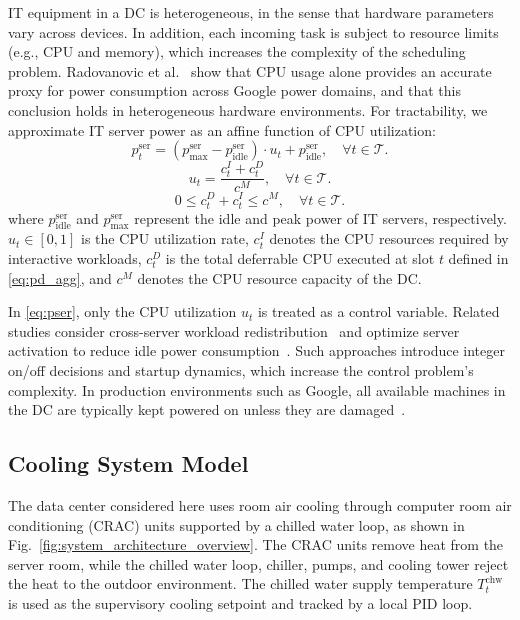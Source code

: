 \documentclass[a4paper,fleqn]{cas-dc}
\theoremstyle{plain}
\theoremstyle{remark}
\theoremstyle{plain}
\begin{document}
IT equipment in a DC is heterogeneous, in the sense that hardware parameters vary across devices. In addition, each incoming task is subject to resource limits (e.g., CPU and memory), which increases the complexity of the scheduling problem. Radovanovic et al.~\cite{radovanovic2023_carbon_aware_computing} show that CPU usage alone provides an accurate proxy for power consumption across Google power domains, and that this conclusion holds in heterogeneous hardware environments. For tractability, we approximate IT server power as an affine function of CPU utilization:
\begin{equation} \label{eq:pser}
p_t^{\text{ser}} = (p_{\max}^{\text{ser}}-p_{\text{idle}}^{\text{ser}})\cdot u_t + p_{\text{idle}}^{\text{ser}}, \quad \forall t\in\mathcal{T}.
\end{equation}
\begin{equation}\label{eq:util}
u_t = \frac{c_t^I + c_t^D}{c^M}, \quad \forall t\in\mathcal{T}.
\end{equation}
\begin{equation}\label{eq:cap}
0 \le c_t^D + c_t^I \le c^M ,\quad \forall t\in\mathcal{T}.
\end{equation}
where $p_{\text{idle}}^{\text{ser}}$ and $p_{\max}^{\text{ser}}$ represent the idle and peak power of IT servers, respectively. $u_t \in \left[0, 1\right]$ is the CPU utilization rate, $c_t^I$ denotes the CPU resources required by interactive workloads, $c_t^D$ is the total deferrable CPU executed at slot $t$ defined in \eqref{eq:pd_agg}, and $c^M$ denotes the CPU resource capacity of the DC.

In \eqref{eq:pser}, only the CPU utilization $u_t$ is treated as a control variable. Related studies consider cross-server workload redistribution~\cite{li2023_thermal_aware_failure} and optimize server activation to reduce idle power consumption~\cite{chitsaz2024_ctmdp_power_mgmt}. Such approaches introduce integer on/off decisions and startup dynamics, which increase the control problem's complexity. In production environments such as Google, all available machines in the DC are typically kept powered on unless they are damaged~\cite{radovanovic2023_carbon_aware_computing}.

\subsection{Cooling System Model}
The data center considered here uses room air cooling through computer room air conditioning (CRAC) units supported by a chilled water loop, as shown in Fig.~\ref{fig:system_architecture_overview}. The CRAC units remove heat from the server room, while the chilled water loop, chiller, pumps, and cooling tower reject the heat to the outdoor environment. The chilled water supply temperature $T_t^{\text{chw}}$ is used as the supervisory cooling setpoint and tracked by a local PID loop.
\end{document}
